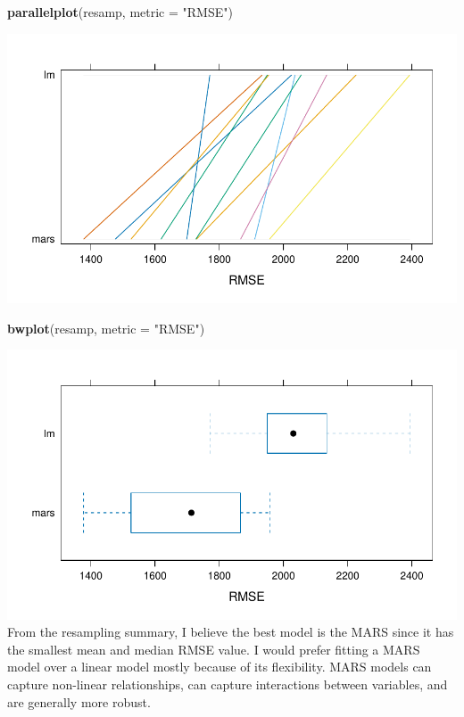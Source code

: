 \documentclass[
]{article}
\newenvironment{Shaded}{\begin{snugshade}}{\end{snugshade}}
\newcommand{\AttributeTok}[1]{\textcolor[rgb]{0.13,0.29,0.53}{#1}}
\newcommand{\FunctionTok}[1]{\textcolor[rgb]{0.13,0.29,0.53}{\textbf{#1}}}
\newcommand{\NormalTok}[1]{#1}
\newcommand{\StringTok}[1]{\textcolor[rgb]{0.31,0.60,0.02}{#1}}
\begin{document}
\begin{Shaded}
\begin{Highlighting}[]
\FunctionTok{parallelplot}\NormalTok{(resamp, }\AttributeTok{metric =} \StringTok{"RMSE"}\NormalTok{)}
\end{Highlighting}
\end{Shaded}

\includegraphics[width=0.9\linewidth]{HW2_co2554_files/figure-latex/model_compare-1}

\begin{Shaded}
\begin{Highlighting}[]
\FunctionTok{bwplot}\NormalTok{(resamp, }\AttributeTok{metric =} \StringTok{"RMSE"}\NormalTok{)}
\end{Highlighting}
\end{Shaded}

\includegraphics[width=0.9\linewidth]{HW2_co2554_files/figure-latex/model_compare-2}
From the resampling summary, I believe the best model is the MARS since
it has the smallest mean and median RMSE value. I would prefer fitting a
MARS model over a linear model mostly because of its flexibility. MARS
models can capture non-linear relationships, can capture interactions
between variables, and are generally more robust.
\end{document}
